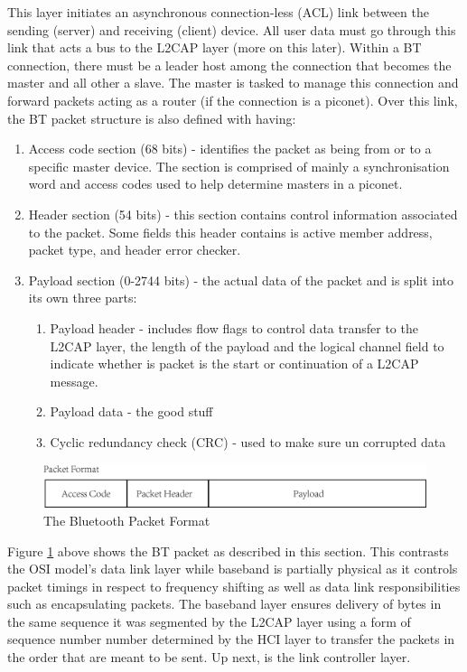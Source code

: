 \documentclass[a4paper,12pt]{article}
\begin{document}
This layer initiates an asynchronous connection-less (ACL) link between the sending (server) and receiving (client) device. All user data must go through this link that acts a bus to the L2CAP layer (more on this later). Within a BT connection, there must be a leader host among the connection that becomes the master and all other a slave. The master is tasked to manage this connection and forward packets acting as a router (if the connection is a piconet). Over this link, the BT packet structure is also defined with having:

\begin{enumerate}
\item Access code section (68 bits) - identifies the packet as being from or to a specific master device. The section is comprised of mainly a synchronisation word and access codes used to help determine masters in a piconet.
\item Header section (54 bits) - this section contains control information associated to the packet. Some fields this header contains is active member address, packet type, and header error checker.
\item Payload section (0-2744 bits) - the actual data of the packet and is split into its own three parts:
    \begin{enumerate}
    \item Payload header - includes flow flags to control data transfer to the L2CAP layer, the length of the payload and the logical channel field to indicate whether is packet is the start or continuation of a L2CAP message. 
    \item Payload data - the good stuff
    \item Cyclic redundancy check (CRC) - used to make sure un corrupted data
    \end{enumerate}
\end{enumerate}

\begin{figure}[h!]
\centering
\includegraphics[scale=.8]{Figures/Figure3.png}
\caption{The Bluetooth Packet Format}
\label{fig:BTPacket}
\end{figure}

Figure \ref{fig:BTPacket} above shows the BT packet as described in this section. This contrasts the OSI model’s data link layer while baseband is partially physical as it controls packet timings in respect to frequency shifting as well as data link responsibilities such as encapsulating packets. The baseband layer ensures delivery of bytes in the same sequence it was segmented by the L2CAP layer using a form of sequence number number determined by the HCI layer to transfer the packets in the order that are meant to be sent. Up next, is the link controller layer.
\end{document}
